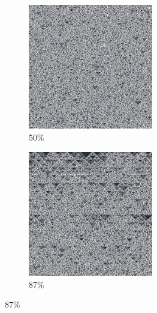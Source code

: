 \documentclass[12pt, fleqn]{report}                             %
\theoremstyle{break}                                            %
\begin{document}
\begin{figure}[ht!]
\begin{subfigure}[b]{0.4\linewidth}
          \includegraphics[width=0.6\textwidth]{Images/90/c.png}
          \caption{50\%}
        \end{subfigure}
        \begin{subfigure}[b]{0.4\linewidth}
          \includegraphics[width=0.6\textwidth]{Images/90/d.png}
          \caption{87\%}
        \end{subfigure}
      \end{figure}
\end{document}
